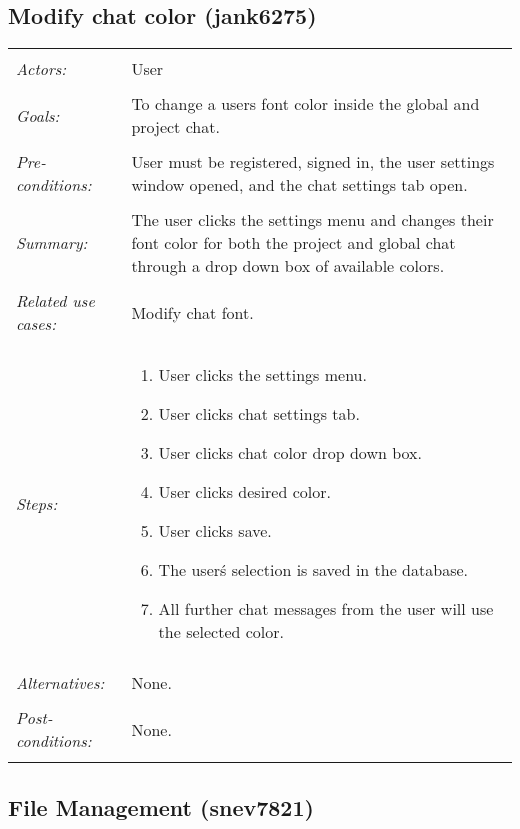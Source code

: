 \documentclass[11pt]{report}
\begin{document}
\subsection{Modify chat color (jank6275)}
\begin{tabular}{ p{2cm} p{12cm} }
 \hline
 \\
 \textit{Actors:} & User \\ 
 \\
 \textit{Goals:} & To change a users font color inside the global and project chat. \\
 \\
 \textit{Pre-conditions:} & User must be registered, signed in, the user settings window opened, and the chat settings tab open.  \\
 \\
 \textit{Summary:} & The user clicks the settings menu and changes their font color for both the project and global chat through a drop down box of available colors. \\ 
 \\
 \textit{Related use cases:} & Modify chat font. \\ 
 \\
 \textit{Steps:} & \begin{enumerate}
  \item User clicks the settings menu.
  \item User clicks chat settings tab.
  \item User clicks chat color drop down box.
  \item User clicks desired color.
  \item User clicks save.
  \item The user\'s selection is saved in the database.
  \item All further chat messages from the user will use the selected color.
 \end{enumerate} \\
 \\
 \textit{Alternatives:} & None. \\
 \\
 \textit{Post-conditions:} & None. \\
 \\
\hline
\end{tabular}



\newpage

\subsection{File Management (snev7821)}
\end{document}
